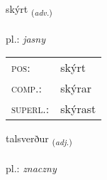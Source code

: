 \documentclass[frontgrid, backgrid]{flacards}\usepackage[]{graphicx}\usepackage[]{xcolor}
\begin{document}
\renewcommand{\flhead}{\vskip5pt \fboxsep=0pt {\small\bfseries\footnotesize Atviksorð | Adverb}}
\renewcommand{\fcfoot}{\vskip5pt \fboxsep=0pt \hspace{2pt}{\small\bfseries\footnotesize 2K}}

\renewcommand{\blhead}{\vskip5pt {\small\bfseries\footnotesize Atviksorð | Adverb }}
\renewcommand{\bcfoot}{\vskip5pt \hspace{2pt}{\small\bfseries\footnotesize 2K}}


{skýrt \small{\textsubscript{(\textit{adv.})}} \\[1ex] %
\textphonetic{[scir̥t]} \\
pl.: \emph{jasny} \\  [2ex]
\renewcommand*{\arraystretch}{0.8}
\begin{tabular}{ll}
\textsc{pos}: & skýrt \\ 
\textsc{comp.}: & skýrar \\ 
\textsc{superl.}: & skýrast \\
\end{tabular}
}

\renewcommand{\flhead}{\vskip5pt \fboxsep=0pt {\small\bfseries\footnotesize Lýsingarorð | Adjective}}
\renewcommand{\fcfoot}{\vskip5pt \fboxsep=0pt \hspace{2pt}{\small\bfseries\footnotesize 2K}}

\renewcommand{\blhead}{\vskip5pt {\small\bfseries\footnotesize Lýsingarorð | Adjective }}
\renewcommand{\bcfoot}{\vskip5pt \hspace{2pt}{\small\bfseries\footnotesize 2K}}


{talsverður \small{\textsubscript{(\textit{adj.})}} \\[1ex] %
\textphonetic{[tʰalsvɛrðʏr]} \\
pl.: \emph{znaczny} \\  [2ex]
\renewcommand*{\arraystretch}{0.8}
}
\end{document}
